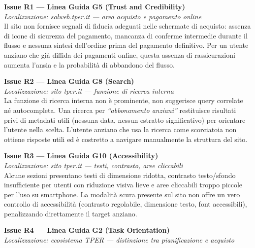 ﻿\documentclass[11pt,a4paper]{article}
\begin{document}
\bigskip

\noindent\textbf{Issue R1 — Linea Guida G5 (Trust and Credibility)}\label{iss:H1}\\
\textit{Localizzazione: solweb.tper.it — area acquisto e pagamento online}\\

\noindent Il sito non fornisce segnali di fiducia adeguati nelle schermate di acquisto: assenza di icone di sicurezza del pagamento, mancanza di conferme intermedie durante il flusso e nessuna sintesi dell'ordine prima del pagamento definitivo. Per un utente anziano che già diffida dei pagamenti online, questa assenza di rassicurazioni aumenta l'ansia e la probabilità di abbandono del flusso.

\bigskip

\noindent\textbf{Issue R2 — Linea Guida G8 (Search)}\label{iss:H2}\\
\textit{Localizzazione: sito tper.it — funzione di ricerca interna}\\

\noindent La funzione di ricerca interna non è prominente, non suggerisce query correlate né autocompleta. Una ricerca per \textit{``abbonamento anziani''} restituisce risultati privi di metadati utili (nessuna data, nessun estratto significativo) per orientare l'utente nella scelta. L'utente anziano che usa la ricerca come scorciatoia non ottiene risposte utili ed è costretto a navigare manualmente la struttura del sito.

\bigskip

\noindent\textbf{Issue R3 — Linea Guida G10 (Accessibility)}\label{iss:H3}\\
\textit{Localizzazione: sito tper.it — testi, contrasto, aree cliccabili}\\

\noindent Alcune sezioni presentano testi di dimensione ridotta, contrasto testo/sfondo insufficiente per utenti con riduzione visiva lieve e aree cliccabili troppo piccole per l'uso su smartphone. La modalità scura presente sul sito non offre un vero controllo di accessibilità (contrasto regolabile, dimensione testo, font accessibili), penalizzando direttamente il target anziano.

\bigskip

\noindent\textbf{Issue R4 — Linea Guida G2 (Task Orientation)}\label{iss:H4}\\
\textit{Localizzazione: ecosistema TPER --- distinzione tra pianificazione
e acquisto}\\
\end{document}
